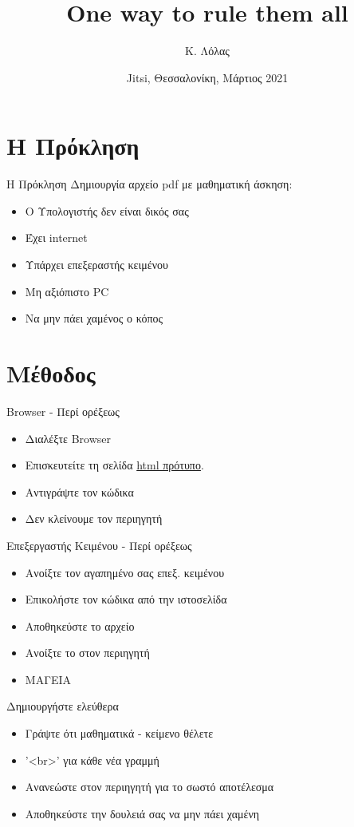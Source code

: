 \documentclass[greek]{beamer}
\title{One way to rule them all}
\author[Λόλας]{Κ. Λόλας\inst{1}}
\institute[]
{
  \inst{1}%
  10ο ΓΕΛ ΘΕΣ/ΝΙΚΗΣ (ΠΕ03)
}
\date{Jitsi, Θεσσαλονίκη, Μάρτιος 2021}
\begin{document}
\begin{frame}
  \titlepage
\end{frame}

\section{Η Πρόκληση}
\begin{frame}{Η Πρόκληση}
  Δημιουργία αρχείο pdf με μαθηματική άσκηση:
  \begin{itemize}
    \item Ο Υπολογιστής δεν είναι δικός σας
    \item Έχει internet
    \item Υπάρχει επεξεραστής κειμένου
    \item Μη αξιόπιστο PC
    \item Να μην πάει χαμένος ο κόπος
  \end{itemize}
\end{frame}

\section{Μέθοδος}
\begin{frame}{Browser - Περί ορέξεως}
  \begin{itemize}
    \item Διαλέξτε Browser
    \item Επισκευτείτε τη σελίδα \href{github.com/costasdroid/lectures/PiDay2021/maths.html}{html πρότυπο}.
    \item Αντιγράψτε τον κώδικα
    \item Δεν κλείνουμε τον περιηγητή
  \end{itemize}
\end{frame}

\begin{frame}{Επεξεργαστής Κειμένου - Περί ορέξεως}
  \begin{itemize}
    \item Ανοίξτε τον αγαπημένο σας επεξ. κειμένου
    \item Επικολήστε τον κώδικα από την ιστοσελίδα
    \item Αποθηκεύστε το αρχείο
    \item Ανοίξτε το στον περιηγητή
    \item ΜΑΓΕΙΑ
  \end{itemize}
\end{frame}

\begin{frame}{Δημιουργήστε ελεύθερα}
  \begin{itemize}
    \item Γράψτε ότι μαθηματικά - κείμενο θέλετε
    \item '<br>' για κάθε νέα γραμμή
    \item Ανανεώστε στον περιηγητή για το σωστό αποτέλεσμα
    \item Αποθηκεύστε την δουλειά σας να μην πάει χαμένη
  \end{itemize}
\end{frame}
\end{document}
